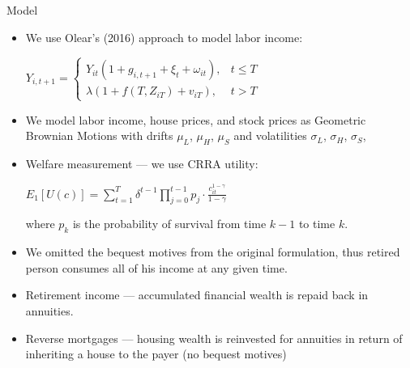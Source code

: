 \documentclass{beamer}
\begin{document}
\begin{frame}[allowframebreaks]{Model}
  \begin{itemize}
	\item We use Olear's (2016) approach to model labor income:

\begin{center}
	$Y_{i,t+1} = 
	\begin{cases}
		Y_{it} (1 + g_{i,t+1} + \xi_t + \omega_{it}), & t \leq T \\
		\lambda (1 + f(T, Z_{iT}) + v_{iT}), & t > T
	\end{cases}	
	$
\end{center}

	\item We model labor income, house prices, and stock prices as Geometric Brownian Motions with drifts $\mu_L$, $\mu_H$, $\mu_S$ and volatilities $\sigma_L$, $\sigma_H$, $\sigma_S$,

\framebreak

	\item Welfare measurement --- we use CRRA utility:

\begin{center}
$	E_1[U(c)] = \displaystyle\sum^T_{t=1} \delta^{t-1} \displaystyle\prod^{t-1}_{j=0} p_j \cdot \frac{c^{1-\gamma}_{it}}{1-\gamma}$
\end{center}

where $p_k$ is the probability of survival from time $k-1$ to time $k$.

	\item We omitted the bequest motives from the original formulation, thus retired person consumes all of his income at any given time.


\framebreak
	
	\item Retirement income --- accumulated financial wealth is repaid back in annuities.
	\item Reverse mortgages --- housing wealth is reinvested for annuities in return of inheriting a house to the payer (no bequest motives) 


\end{itemize}
\end{frame}
\end{document}
